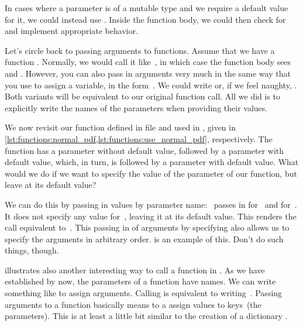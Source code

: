 In cases where a parameter is of a mutable type and we require a default value for it, we could instead use .
Inside the function body, we could then check for  and implement appropriate behavior.%
%
\begin{sloppypar}%
Let's circle back to passing arguments to functions.
Assume that we have a function .
Normally, we would call it like~, in which case the function body sees  and .
However, you can also pass in arguments very much in the same way that you use to assign a variable, in the form~.
We could write  or, if we feel naughty, .
Both variants will be equivalent to our original function call.
All we did is to explicitly write the names of the parameters when providing their values.%
\end{sloppypar}%
%
%
We now revisit our  function defined in file  and used in , given in \cref{lst:functions:normal_pdf,lst:functions:use_normal_pdf}, respectively.
The function  has a parameter  without default value, followed by a parameter  with default value, which, in turn, is followed by a parameter  with default value.
What would we do if we want to specify the value of the parameter  of our function, but leave  at its default value?%
%
\begin{sloppypar}%
We can do this by passing in values by parameter name:
~passes in  for~ and  for~.
It does not specify any value for~, leaving it at its default value.
This renders the call equivalent to~.
This passing in of arguments by specifying  also allows us to specify the arguments in arbitrary order.
 is an example of this.
Don't do such things, though.%
\end{sloppypar}%
%
\begin{sloppypar}%
 illustrates also another interesting way to call a function in \python.
As we have established by now, the parameters of a function have names.
We can write something like  to assign arguments.
Calling  is equivalent to writing~.
Passing arguments to a function basically means to a assign values to keys~(the parameters).
This is at least a little bit similar to the creation of a dictionary .%
\end{sloppypar}%
